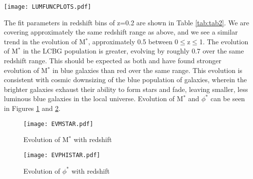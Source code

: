 \documentclass[manuscript]{aastex61}
\begin{document}
\begin{center}
\begin{figure*}
\texttt{[image: LUMFUNCPLOTS.pdf]}
\caption{Luminosity function for the entire galaxy population (green) and LCBGs (blue). Points marked with an x are not considered in our fit. They are most often regions of M$_{B}$-z space that are not sampled well enough to give a proper estimate of $\Phi$ in that bin. The histogram below each plot shows the log$_{10}$ of the number of objects in each bin, with the white bars being total galaxies, and the gray bars being LCBGs. The number in each bin is listed above each bar. }
\label{fig:LCBGLUMFUNC}
\end{figure*}
\end{center}
The fit parameters in redshift bins of z=0.2 are shown in Table \ref{tab:tab2}. We are covering approximately the same redshift range as above, and we see a similar trend in the evolution of M$^{*}$, approximately 0.5 between 0$\leq$z$\leq$1. The evolution of M$^{*}$ in the LCBG population is greater, evolving by roughly 0.7 over the same redshift range. This should be expected as both \citet{2006ApJ...647..853W} and \citet{2015ApJ...815...94B} have found stronger evolution of M$^{*}$ in blue galaxies than red over the same range. This evolution is consistent with cosmic downsizing \citet{1996AJ....112..839C} of the blue population of galaxies, wherein the brighter galaxies exhaust their ability to form stars and fade, leaving smaller, less luminous blue galaxies in the local universe.
Evolution of M$^{*}$ and $\phi^{*}$ can be seen in Figures \ref{fig:EVMSTAR} and \ref{fig:EVPHISTAR}. 
\begin{center}
\begin{figure}
\texttt{[image: EVMSTAR.pdf]}
\caption{Evolution of M$^{*}$ with redshift}
\label{fig:EVMSTAR}
\end{figure}
\end{center}
\begin{center}
\begin{figure}
\texttt{[image: EVPHISTAR.pdf]}
\caption{Evolution of $\phi^{*}$ with redshift}
\label{fig:EVPHISTAR}
\end{figure}
\end{center}
\end{document}
